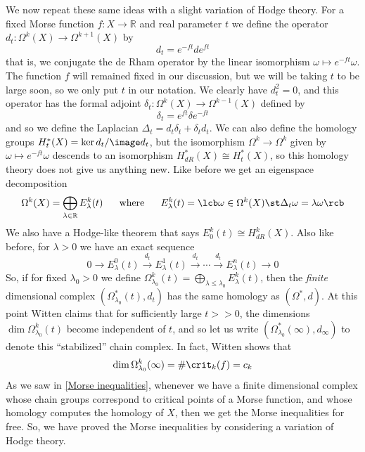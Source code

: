 We now repeat these same ideas with a slight variation of Hodge theory. For a fixed Morse function $f : X \rightarrow \mathbb R$ and real parameter $t$ we define the operator $d_t : \Omega^k(X) \rightarrow \Omega^{k+1}(X)$ by
\[ d_t = e^{-ft} d e^{ft} \]
that is, we conjugate the de Rham operator by the linear isomorphism $\omega \mapsto e^{-ft} \omega$. The function $f$ will remained fixed in our discussion, but we will be taking $t$ to be large soon, so we only put $t$ in our notation. We clearly have $d_t^2 = 0$, and this operator has the formal adjoint $\delta_t : \Omega^k(X) \rightarrow \Omega^{k-1}(X)$ defined by
\[ \delta_t = e^{ft} \delta e^{-ft} \]
and so we define the Laplacian $\Delta_t = d_t\delta_t + \delta_t d_t$. We can also define the homology groups $H_t^*(X) = \ker d_t / \image d_t$, but the isomorphism $\Omega^k \rightarrow \Omega^k$ given by $\omega \mapsto e^{-ft} \omega$ descends to an isomorphism $H_{dR}^*(X) \cong H_t^*(X)$, so this homology theory does not give us anything new. Like before we get an eigenspace decomposition
\[ \Omega^k(X) = \bigoplus_{\lambda \in \mathbb R} E_\lambda^k(t) \ \ \ \ \ \text{where} \ \ \ \ \ E_\lambda^k(t) = \lcb \omega \in \Omega^k(X) \st \Delta_t \omega = \lambda \omega \rcb \]
We also have a Hodge-like theorem that says $E_0^k(t) \cong H_{dR}^k(X)$. Also like before, for $\lambda > 0$ we have an exact sequence
\[ 0 \longrightarrow E_\lambda^0(t) \stackrel{d_t}{\longrightarrow} E_\lambda^1(t) \stackrel{d_t}{\longrightarrow} \cdots \stackrel{d_t}{\longrightarrow} E_\lambda^n(t) \longrightarrow 0 \]
So, if for fixed $\lambda_0 > 0$ we define $\Omega_{\lambda_0}^k(t) = \bigoplus_{\lambda \leq \lambda_0} E_\lambda^k(t)$, then the \emph{finite} dimensional complex $(\Omega_{\lambda_0}^*(t),d_t)$ has the same homology as $(\Omega^*,d)$. At this point Witten claims that for sufficiently large $t >> 0$, the dimensions $\dim \Omega_{\lambda_0}^k(t)$ become independent of $t$, and so let us write $(\Omega_{\lambda_0}^*(\infty),d_\infty)$ to denote this ``stabilized'' chain complex. In fact, Witten shows that
\[ \dim \Omega_{\lambda_0}^k(\infty) = \# \crit_k(f) = c_k \]
As we saw in \cref{Morse inequalities}, whenever we have a finite dimensional complex whose chain groups correspond to critical points of a Morse function, and whose homology computes the homology of $X$, then we get the Morse inequalities for free. So, we have proved the Morse inequalities by considering a variation of Hodge theory.

